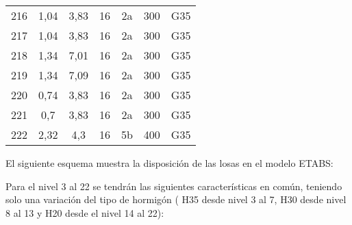 \begin{table}[H]
\begin{tabular}{ccccccc}
    216 &      1,04 &      3,83 &      16 &      2a &      300 &      G35      \\
    217 &      1,04 &      3,83 &      16 &      2a &      300 &      G35      \\
    218 &      1,34 &      7,01 &      16 &      2a &      300 &      G35      \\
    219 &      1,34 &      7,09 &      16 &      2a &      300 &      G35      \\
    220 &      0,74 &      3,83 &      16 &      2a &      300 &      G35      \\
    221 &      0,7 &      3,83 &      16 &      2a &      300 &      G35      \\
    222 &      2,32 &      4,3 &      16 &      5b &      400 &      G35      \bigstrut[b]\\
    \hline
      \end{tabular}
      \label{losas2}
    \end{table}

\newpage

El siguiente esquema muestra la disposición de las losas en el modelo ETABS:


\newpage

Para el nivel 3 al 22 se tendrán las siguientes características en común, teniendo solo una variación del tipo de hormigón ( H35 desde nivel 3 al 7, H30 desde nivel 8 al 13 y H20 desde el nivel 14 al 22):

